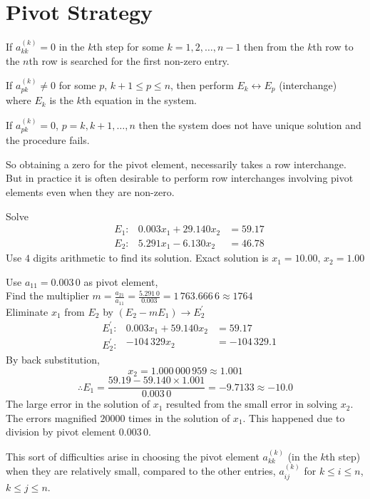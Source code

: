 \documentclass[12pt,class=book,crop=false]{standalone}
\begin{document}
\section{Pivot Strategy}
If \( a_{kk}^{(k)}=0 \) in the \( k \)th step for some \( k=1,2,\dots,n-1 \) then from the \( k \)th row to the \( n \)th row is searched for the first non-zero entry.

If \( a_{pk}^{(k)}\neq 0 \) for some \( p \), \( k+1\leq p\leq n \), then perform \( E_k \longleftrightarrow E_p \) (interchange) where \( E_k \) is the \( k \)th equation in the system.

If \( a_{pk}^{(k)}= 0 \), \( p=k,k+1,\dots,n \) then the system does not have unique solution and the procedure fails.

So obtaining a zero for the pivot element, necessarily takes a row interchange. But in practice it is often desirable to perform row interchanges involving pivot elements even when they are non-zero.
\begin{prob}
    Solve
    \[
        \left.\begin{aligned}
             & E_1: \\
             & E_2:
        \end{aligned}\right.
        \left.\begin{aligned}
            0.003x_1+29.140x_2 & =59.17 \\
            5.291x_1-6.130x_2  & =46.78
        \end{aligned}\right.
    \]
    Use \( 4 \) digits arithmetic to find its solution. Exact solution is \( x_1=10.00,\,x_2=1.00 \)
\end{prob}
\begin{soln}
    Use \( a_{11}=0.003\,0  \) as pivot element,\\
    Find the multiplier \( m=\frac{a_{21}}{a_{11}}=\frac{5.291\,0}{0.003}=1\,763.666\,6\approx1764 \)\\
    Eliminate \( x_1 \) from \( E_2 \) by \( (E_2-mE_1)\rightarrow E_2^{'} \)
    \[
        \left.\begin{aligned}
             & E_1^{'}: \\
             & E_2^{'}:
        \end{aligned}\right.
        \left.\begin{aligned}
            0.003x_1+59.140x_2 & =59.17     \\
            -104\,329x_2         & =-104\,329.1
        \end{aligned}\right.
    \]
    By back substitution,
    \[
        x_2=1.000\,000\,959\approx1.001
    \]
    \[
        \therefore E_1=\frac{59.19-59.140\times1.001}{0.003\,0}=-9.7133\approx-10.0
    \]
    The large error in the solution of \( x_1 \) resulted from the small error in solving \( x_2 \). The errors magnified \( 20000 \) times in the solution of \( x_1 \). This happened due to division by pivot element \( 0.003\,0 \).
\end{soln}
This sort of difficulties arise in choosing the pivot element \( a_{kk}^{(k)} \) (in the \( k \)th step) when they are relatively small, compared to the other entries,
\( a_{ij}^{(k)}\) for \( k\leq i\leq n \), \( k\leq j\leq n \).
\end{document}
